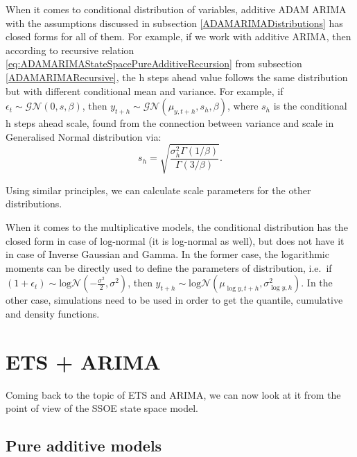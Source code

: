 \documentclass[]{book}
\theoremstyle{definition}
\theoremstyle{definition}
\theoremstyle{definition}
\theoremstyle{definition}
\theoremstyle{remark}
\begin{document}
When it comes to conditional distribution of variables, additive ADAM ARIMA with the assumptions discussed in subsection \ref{ADAMARIMADistributions} has closed forms for all of them. For example, if we work with additive ARIMA, then according to recursive relation \eqref{eq:ADAMARIMAStateSpacePureAdditiveRecursion} from subsection \ref{ADAMARIMARecursive}, the h steps ahead value follows the same distribution but with different conditional mean and variance. For example, if \(\epsilon_t \sim \mathcal{GN}(0, s, \beta)\), then \(y_{t+h} \sim \mathcal{GN}(\mu_{y,t+h}, s_{h}, \beta)\), where \(s_{h}\) is the conditional h steps ahead scale, found from the connection between variance and scale in Generalised Normal distribution via:
\begin{equation*}
    s_h = \sqrt{\frac{\sigma^2_h \Gamma(1/\beta)}{\Gamma(3/\beta)}}.
\end{equation*}

Using similar principles, we can calculate scale parameters for the other distributions.

When it comes to the multiplicative models, the conditional distribution has the closed form in case of log-normal (it is log-normal as well), but does not have it in case of Inverse Gaussian and Gamma. In the former case, the logarithmic moments can be directly used to define the parameters of distribution, i.e.~if \(\left(1+\epsilon_t \right) \sim \text{log}\mathcal{N}\left(-\frac{\sigma^2}{2}, \sigma^2\right)\), then \(y_{t+h} \sim \text{log}\mathcal{N}\left(\mu_{\log y,t+h}, \sigma^2_{\log y,h} \right)\). In the other case, simulations need to be used in order to get the quantile, cumulative and density functions.

\hypertarget{ETSAndARIMA}{%
\section{ETS + ARIMA}\label{ETSAndARIMA}}

Coming back to the topic of ETS and ARIMA, we can now look at it from the point of view of the SSOE state space model.

\hypertarget{pure-additive-models}{%
\subsection{Pure additive models}\label{pure-additive-models}}
\end{document}
